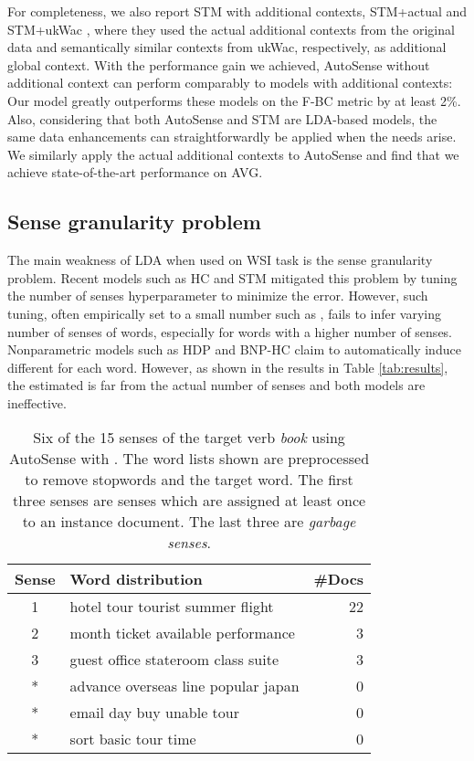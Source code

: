 \documentclass[letterpaper]{article} \usepackage{aaai19}
\begin{document}
For completeness, we also report STM with additional contexts, STM+actual and STM+ukWac \cite{wang2015sense}, where they used the actual additional contexts from the original data and semantically similar contexts from ukWac, respectively, as additional global context. With the performance gain we achieved, AutoSense without additional context can perform comparably to models with additional contexts: Our model greatly outperforms these models on the F-BC metric by at least 2\%. Also, considering that both AutoSense and STM are LDA-based models, the same data enhancements can straightforwardly be applied when the needs arise. We similarly apply the actual additional contexts to AutoSense and find that we achieve state-of-the-art performance on \textsc{AVG}.

\subsection{Sense granularity problem} \label{sec:sensegran}

The main weakness of LDA when used on WSI task is the sense granularity problem. Recent models such as HC \cite{chang2014inducing} and STM \cite{wang2015sense} mitigated this problem by tuning the number of senses hyperparameter  to minimize the error. However, such tuning, often empirically set to a small number such as  \cite{wang2015sense}, fails to infer varying number of senses of words, especially for words with a higher number of senses. Nonparametric models such as HDP and BNP-HC \cite{lau2013unimelb,chang2014inducing} claim to automatically induce different  for each word. However, as shown in the results in Table \ref{tab:results}, the estimated  is far from the actual number of senses and both models are ineffective.

\begin{table}[!t]
	\centering
	\begin{tabular}{|c|l|r|}
		\hline
		Sense & Word distribution & \#Docs \\ \hline
		1 & hotel tour tourist summer flight & 22 \\ \hline
		2 & month ticket available performance & 3 \\ \hline
		3 & guest office stateroom class suite & 3 \\ \hline
		* & advance overseas line popular japan & 0 \\ \hline
		* & email day buy unable tour & 0 \\ \hline
		* & sort basic tour time & 0 \\ \hline
	\end{tabular}
	\caption{Six of the 15 senses of the target verb \textit{book} using AutoSense with .
		The word lists shown are preprocessed to remove stopwords and the target word.
		The first three senses are senses which are assigned at least once to an instance document. The last three are \textit{garbage senses}.}
	\label{tab:sample}
\end{table}
\label{sec:senses}
\end{document}
